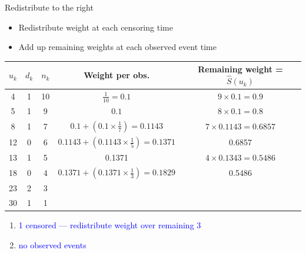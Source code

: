 \documentclass[10pt,t]{beamer}
\begin{document}
\begin{frame}{Redistribute to the right}
	\begin{itemize}
		\item Redistribute weight at each censoring time
		\item Add up remaining weights at each observed event time
	\end{itemize}
	\begin{footnotesize}
		\begin{tabular}{|c|c|c|c|c|}
			\hline
			$u_k$ & $d_k$ & $n_k$ & Weight per obs. & Remaining weight = $\widehat{S}(u_k)$ \\
			\hline
			4 & 1 & 10 & $\frac{1}{10} = 0.1$ & $9\times 0.1= 0.9$\\
			5 & 1 & 9 & $0.1$ &  $8\times 0.1= 0.8$  \\
			8 & 1 & 7 & $0.1 + (0.1\times \frac{1}{7}) = 0.1143$ & $7 \times 0.1143 = 0.6857$\\
			12 & 0 & 6 & $0.1143 +  (0.1143\times\frac{1}{5}) = 0.1371$ &  0.6857\\
			13 & 1 & 5 & 0.1371 & $4 \times 0.1343 =0.5486 $\\
			18 & 0 & 4 & $0.1371 + (0.1371\times \frac{1}{3}) = 0.1829$ & 0.5486\\
			23 & 2 & 3 & & \\
			30 & 1 & 1 & & \\
			\hline
		\end{tabular}
	\end{footnotesize}
	\begin{enumerate}
		\item \textcolor{blue}{1 censored --- redistribute weight over remaining 3}
		\item \textcolor{blue}{no observed events}
	\end{enumerate}
\end{frame}
\end{document}
